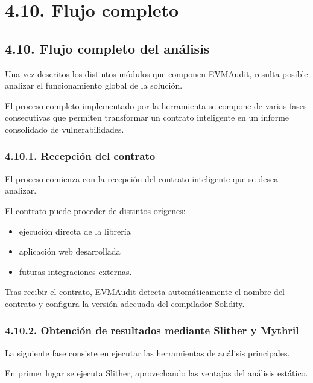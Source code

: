 \section{4.10. Flujo completo}\label{flujo-completo}

\subsection{4.10. Flujo completo del
análisis}\label{flujo-completo-del-anuxe1lisis}

Una vez descritos los distintos módulos que componen EVMAudit, resulta
posible analizar el funcionamiento global de la solución.

El proceso completo implementado por la herramienta se compone de varias
fases consecutivas que permiten transformar un contrato inteligente en
un informe consolidado de vulnerabilidades.

\subsubsection{4.10.1. Recepción del
contrato}\label{recepciuxf3n-del-contrato}

El proceso comienza con la recepción del contrato inteligente que se
desea analizar.

El contrato puede proceder de distintos orígenes:

\begin{itemize}
\tightlist
\item
  ejecución directa de la librería
\item
  aplicación web desarrollada
\item
  futuras integraciones externas.
\end{itemize}

Tras recibir el contrato, EVMAudit detecta automáticamente el nombre del
contrato y configura la versión adecuada del compilador Solidity.

\subsubsection{4.10.2. Obtención de resultados mediante Slither y
Mythril}\label{obtenciuxf3n-de-resultados-mediante-slither-y-mythril}

La siguiente fase consiste en ejecutar las herramientas de análisis
principales.

En primer lugar se ejecuta Slither, aprovechando las ventajas del
análisis estático.

